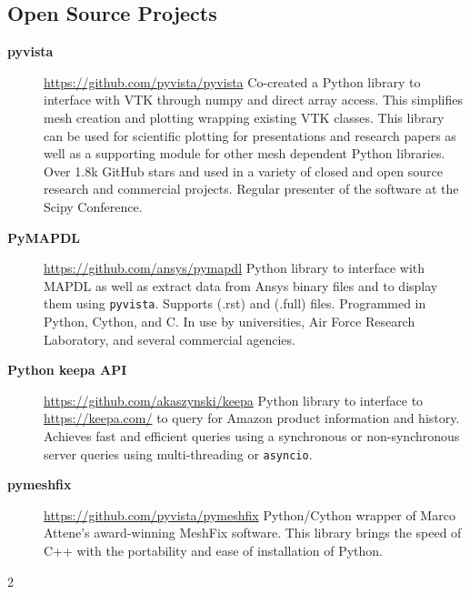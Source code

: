 \documentclass[lighthipster]{simplehipstercv}
\begin{document}
\begin{paracol}{2}

\section*{Open Source Projects}
\label{sec:open-source-projects}

\begin{description}
\item[\textbf{pyvista}] \url{https://github.com/pyvista/pyvista} \newline
  Co-created a Python library to interface with VTK through numpy and direct array access. This simplifies mesh creation and plotting wrapping existing VTK classes. This library can be used for scientific plotting for presentations and research papers as well as a supporting module for other mesh dependent Python libraries. Over 1.8k GitHub stars and used in a variety of closed and open source research and commercial projects. Regular presenter of the software at the Scipy Conference.
\item[\textbf{PyMAPDL}] \url{https://github.com/ansys/pymapdl} \newline
  Python library to interface with MAPDL as well as extract data from Ansys binary files and to display them using \texttt{pyvista}. Supports (.rst) and (.full) files. Programmed in Python, Cython, and C. In use by universities, Air Force Research Laboratory, and several commercial agencies.
\item[\textbf{Python keepa API}] \url{https://github.com/akaszynski/keepa} \newline
Python library to interface to \url{https://keepa.com/} to query for Amazon product information and history. Achieves fast and efficient queries using a synchronous or non-synchronous server queries using multi-threading or \texttt{asyncio}.
\item[\textbf{pymeshfix}] \url{https://github.com/pyvista/pymeshfix} \newline
Python/Cython wrapper of Marco Attene's award-winning MeshFix software. This library brings the speed of C++ with the portability and ease of installation of Python.
\end{description}

%
%
%
\end{paracol}{2}
\end{document}
